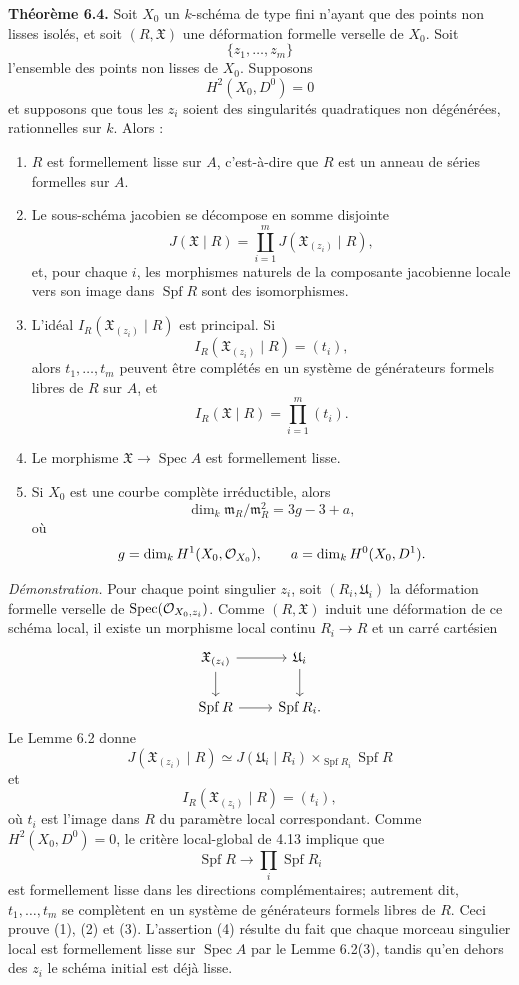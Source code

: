 \documentclass[11pt]{article}
\providecommand{\Spec}{\operatorname{Spec}}
\providecommand{\Spf}{\operatorname{Spf}}
\begin{document}
\textbf{Théorème 6.4.}  Soit \(X_0\) un \(k\)-schéma de type fini n'ayant que des points non lisses isolés, et soit \((R,\mathfrak X)\) une déformation formelle verselle de \(X_0\).  Soit
\[
        \{z_1,\ldots,z_m\}
\]
l'ensemble des points non lisses de \(X_0\).  Supposons
\[
        H^2(X_0,D^0)=0
\]
et supposons que tous les \(z_i\) soient des singularités quadratiques non dégénérées, rationnelles sur \(k\).  Alors :
\begin{enumerate}[label=(\arabic*)]
\item \(R\) est formellement lisse sur \(A\), c'est-à-dire que \(R\) est un anneau de séries formelles sur \(A\).
\item Le sous-schéma jacobien se décompose en somme disjointe
\[
        J(\mathfrak X\mid R)
        =
        \coprod_{i=1}^m J(\mathfrak X_{(z_i)}\mid R),
\]
et, pour chaque \(i\), les morphismes naturels de la composante jacobienne locale vers son image dans \(\Spf R\) sont des isomorphismes.
\item L'idéal \(I_R(\mathfrak X_{(z_i)}\mid R)\) est principal.  Si
\[
        I_R(\mathfrak X_{(z_i)}\mid R)=(t_i),
\]
alors \(t_1,\ldots,t_m\) peuvent être complétés en un système de générateurs formels libres de \(R\) sur \(A\), et
\[
        I_R(\mathfrak X\mid R)=\prod_{i=1}^m(t_i).
\]
\item Le morphisme \(\mathfrak X\to\Spec A\) est formellement lisse.
\item Si \(X_0\) est une courbe complète irréductible, alors
\[
        \dim_k\mathfrak m_R/\mathfrak m_R^2
        =
        3g-3+a,
\]
où
\[
        g=\dim_k H^1(X_0,\mathcal O_{X_0}),
        \qquad
        a=\dim_k H^0(X_0,D^1).
\]
\end{enumerate}

\emph{Démonstration.}  Pour chaque point singulier \(z_i\), soit \((R_i,\mathfrak U_i)\) la déformation formelle verselle de \(\Spec(\Oo_{X_0,z_i})\).  Comme \((R,\mathfrak X)\) induit une déformation de ce schéma local, il existe un morphisme local continu \(R_i\to R\) et un carré cartésien
\[
\begin{tikzcd}
\mathfrak X_{(z_i)} \arrow[r] \arrow[d] &
\mathfrak U_i \arrow[d]\\
\Spf R \arrow[r] & \Spf R_i .
\end{tikzcd}
\]
Le Lemme 6.2 donne
\[
        J(\mathfrak X_{(z_i)}\mid R)
        \simeq
        J(\mathfrak U_i\mid R_i)\times_{\Spf R_i}\Spf R
\]
et
\[
        I_R(\mathfrak X_{(z_i)}\mid R)=(t_i),
\]
où \(t_i\) est l'image dans \(R\) du paramètre local correspondant.  Comme \(H^2(X_0,D^0)=0\), le critère local-global de 4.13 implique que
\[
        \Spf R\longrightarrow \prod_i\Spf R_i
\]
est formellement lisse dans les directions complémentaires; autrement dit, \(t_1,\ldots,t_m\) se complètent en un système de générateurs formels libres de \(R\).  Ceci prouve (1), (2) et (3).  L'assertion (4) résulte du fait que chaque morceau singulier local est formellement lisse sur \(\Spec A\) par le Lemme 6.2(3), tandis qu'en dehors des \(z_i\) le schéma initial est déjà lisse.
\end{document}
